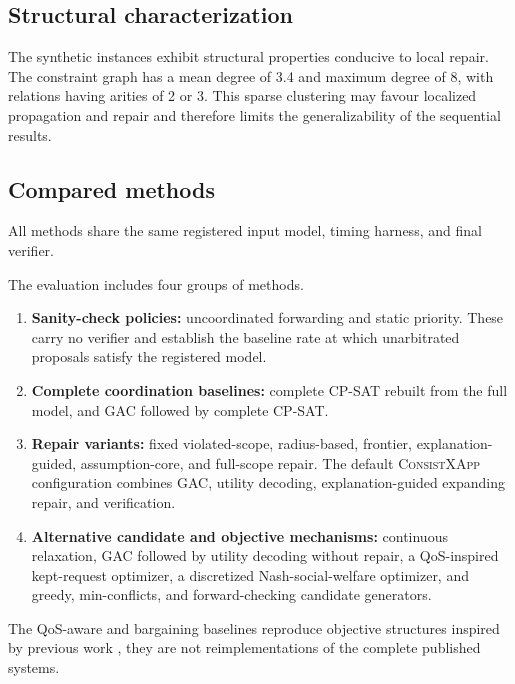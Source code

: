 \documentclass[pdflatex,sn-mathphys-num,iicol,oneside]{sn-jnl}
\newcommand{\method}{\textsc{ConsistXApp}\xspace}
\newcommand{\gac}{\textsc{GAC}\xspace}
\newcommand{\cpsat}{\textsc{CP-SAT}\xspace}
\begin{document}
\subsection{Structural characterization}

The synthetic instances exhibit structural properties conducive to local repair. The constraint graph has a mean degree of 3.4 and maximum degree of 8, with relations having arities of 2 or 3. This sparse clustering may favour localized propagation and repair and therefore limits the generalizability of the sequential results.

\subsection{Compared methods}

All methods share the same registered input model, timing harness, and
final verifier.

The evaluation includes four groups of methods.

\begin{enumerate}[label=\arabic*.,leftmargin=1.6em]

\item \textbf{Sanity-check policies:} uncoordinated forwarding and
static priority. These carry no verifier and establish the baseline
rate at which unarbitrated proposals satisfy the registered model.

\item \textbf{Complete coordination baselines:} complete \cpsat
rebuilt from the full model, and \gac followed by complete \cpsat.

\item \textbf{Repair variants:} fixed violated-scope, radius-based,
frontier, explanation-guided, assumption-core, and full-scope repair.
The default \method configuration combines \gac, utility decoding,
explanation-guided expanding repair, and verification.

\item \textbf{Alternative candidate and objective mechanisms:}
continuous relaxation, \gac followed by utility decoding without
repair, a QoS-inspired kept-request optimizer, a discretized
Nash-social-welfare optimizer, and greedy, min-conflicts, and
forward-checking candidate generators.

\end{enumerate}

The QoS-aware and bargaining baselines reproduce objective structures
inspired by previous work
\cite{wadud2024qacm,wadud2023game}, they are not reimplementations of
the complete published systems.
\end{document}
